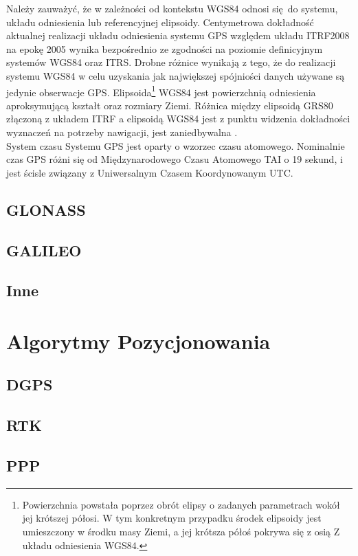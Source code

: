 Należy zauważyć, że w zależności od kontekstu WGS84 odnosi się do systemu, układu odniesienia lub referencyjnej elipsoidy.
Centymetrowa dokładność aktualnej realizacji układu odniesienia systemu GPS względem układu ITRF2008 na epokę 2005
wynika bezpośrednio ze zgodności na poziomie definicyjnym systemów WGS84 oraz ITRS. Drobne różnice wynikają z tego, że do realizacji systemu WGS84 w celu uzyskania jak 
największej spójniości danych używane są jedynie obserwacje GPS. Elipsoida\footnote{Powierzchnia powstała poprzez obrót elipsy o zadanych parametrach wokół jej 
krótszej półosi. W tym konkretnym przypadku środek elipsoidy jest umieszczony w środku masy Ziemi, a jej krótsza półoś pokrywa się z osią Z układu odniesienia WGS84.}
WGS84 jest powierzchnią odniesienia aproksymującą kształt oraz rozmiary Ziemi. Różnica między elipsoidą GRS80 złączoną z układem ITRF a elipsoidą WGS84 jest z punktu 
widzenia dokładności wyznaczeń na potrzeby nawigacji, jest zaniedbywalna \cite[][strona 50]{donnelly}.\\
\indent System czasu Systemu GPS jest oparty o wzorzec czasu atomowego. Nominalnie czas GPS różni się od Międzynarodowego Czasu Atomowego TAI o 19 sekund, i jest 
ścisle związany z Uniwersalnym Czasem Koordynowanym UTC.  
 	\subsection{GLONASS}
	\subsection{GALILEO}
	\subsection{Inne}
\section{Algorytmy Pozycjonowania}
	\subsection{DGPS}
	\subsection{RTK}
	\subsection{PPP}

